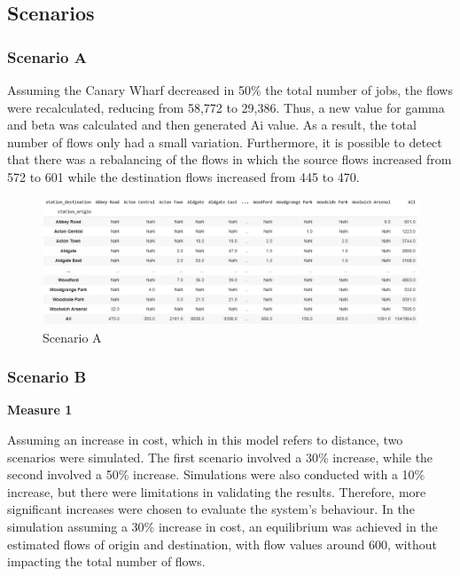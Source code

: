 \documentclass[10pt]{report}
\numberwithin{figure}{section}
\numberwithin{table}{section}
\begin{document}
\subsection{Scenarios}
\subsubsection{Scenario A}

Assuming the Canary Wharf decreased in 50\% the total number of jobs, the flows were recalculated, reducing from 58,772 to 29,386. Thus, a new value for gamma and beta was calculated and then generated Ai value. As a result, the total number of flows only had a small variation. Furthermore, it is possible to detect that there was a rebalancing of the flows in which the source flows increased from 572 to 601 while the destination flows increased from 445 to 470.

    \begin{figure}[htp]
        \centering
        \includegraphics[width=16cm]{Image/Part2_OD4_scenario A.png}
        \caption{Scenario A}
        \label{fig:Part2_OD4_scenario A}
    \end{figure}

\newpage    

\subsubsection{Scenario B}

\textbf{Measure 1}

Assuming an increase in cost, which in this model refers to distance, two scenarios were simulated. The first scenario involved a 30\% increase, while the second involved a 50\% increase. Simulations were also conducted with a 10\% increase, but there were limitations in validating the results. Therefore, more significant increases were chosen to evaluate the system's behaviour. In the simulation assuming a 30\% increase in cost, an equilibrium was achieved in the estimated flows of origin and destination, with flow values around 600, without impacting the total number of flows.
\end{document}

